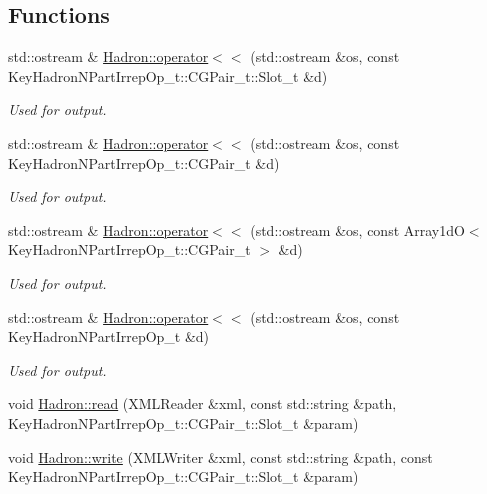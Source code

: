 \subsection*{Functions}
\begin{DoxyCompactItemize}
\item 
std\+::ostream \& \mbox{\hyperlink{namespaceHadron_a61a4a4487102a9f9ee4c9409df53d3ed}{Hadron\+::operator$<$$<$}} (std\+::ostream \&os, const Key\+Hadron\+N\+Part\+Irrep\+Op\+\_\+t\+::\+C\+G\+Pair\+\_\+t\+::\+Slot\+\_\+t \&d)
\begin{DoxyCompactList}\small\item\em Used for output. \end{DoxyCompactList}\item 
std\+::ostream \& \mbox{\hyperlink{namespaceHadron_a84411155d0fadad0466230e8cdd0d17c}{Hadron\+::operator$<$$<$}} (std\+::ostream \&os, const Key\+Hadron\+N\+Part\+Irrep\+Op\+\_\+t\+::\+C\+G\+Pair\+\_\+t \&d)
\begin{DoxyCompactList}\small\item\em Used for output. \end{DoxyCompactList}\item 
std\+::ostream \& \mbox{\hyperlink{namespaceHadron_a43b2528d47caea41d1eca554b9106b9c}{Hadron\+::operator$<$$<$}} (std\+::ostream \&os, const Array1dO$<$ Key\+Hadron\+N\+Part\+Irrep\+Op\+\_\+t\+::\+C\+G\+Pair\+\_\+t $>$ \&d)
\begin{DoxyCompactList}\small\item\em Used for output. \end{DoxyCompactList}\item 
std\+::ostream \& \mbox{\hyperlink{namespaceHadron_a6d4dd7ed7a6efa27888f4ea9bdd20e51}{Hadron\+::operator$<$$<$}} (std\+::ostream \&os, const Key\+Hadron\+N\+Part\+Irrep\+Op\+\_\+t \&d)
\begin{DoxyCompactList}\small\item\em Used for output. \end{DoxyCompactList}\item 
void \mbox{\hyperlink{namespaceHadron_ab955c28b5566e0df089a26a611d4bf03}{Hadron\+::read}} (X\+M\+L\+Reader \&xml, const std\+::string \&path, Key\+Hadron\+N\+Part\+Irrep\+Op\+\_\+t\+::\+C\+G\+Pair\+\_\+t\+::\+Slot\+\_\+t \&param)
\item 
void \mbox{\hyperlink{namespaceHadron_a005000ac92ae829ca325627dae07fb51}{Hadron\+::write}} (X\+M\+L\+Writer \&xml, const std\+::string \&path, const Key\+Hadron\+N\+Part\+Irrep\+Op\+\_\+t\+::\+C\+G\+Pair\+\_\+t\+::\+Slot\+\_\+t \&param)

\end{DoxyCompactItemize}
